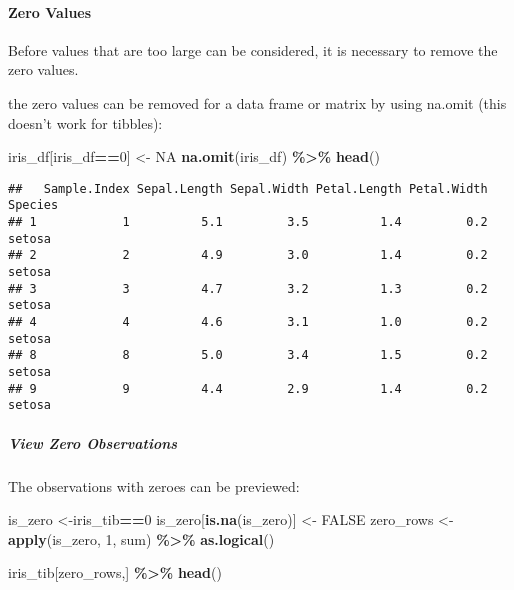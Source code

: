 \documentclass[
]{article}
\newenvironment{Shaded}{\begin{snugshade}}{\end{snugshade}}
\newcommand{\DecValTok}[1]{\textcolor[rgb]{0.00,0.00,0.81}{#1}}
\newcommand{\KeywordTok}[1]{\textcolor[rgb]{0.13,0.29,0.53}{\textbf{#1}}}
\newcommand{\NormalTok}[1]{#1}
\newcommand{\OperatorTok}[1]{\textcolor[rgb]{0.81,0.36,0.00}{\textbf{#1}}}
\newcommand{\OtherTok}[1]{\textcolor[rgb]{0.56,0.35,0.01}{#1}}
\newcommand{\StringTok}[1]{\textcolor[rgb]{0.31,0.60,0.02}{#1}}
\begin{document}
\hypertarget{zero-values}{%
\paragraph{Zero Values}\label{zero-values}}

Before values that are too large can be considered, it is necessary to
remove the zero values.

the zero values can be removed for a data frame or matrix by using
na.omit (this doesn't work for tibbles):

\begin{Shaded}
\begin{Highlighting}[]
\NormalTok{iris\_df[iris\_df}\OperatorTok{==}\DecValTok{0}\NormalTok{] <{-}}\StringTok{ }\OtherTok{NA}
\KeywordTok{na.omit}\NormalTok{(iris\_df) }\OperatorTok{\%>\%}\StringTok{ }\KeywordTok{head}\NormalTok{()}
\end{Highlighting}
\end{Shaded}

\begin{verbatim}
##   Sample.Index Sepal.Length Sepal.Width Petal.Length Petal.Width Species
## 1            1          5.1         3.5          1.4         0.2  setosa
## 2            2          4.9         3.0          1.4         0.2  setosa
## 3            3          4.7         3.2          1.3         0.2  setosa
## 4            4          4.6         3.1          1.0         0.2  setosa
## 8            8          5.0         3.4          1.5         0.2  setosa
## 9            9          4.4         2.9          1.4         0.2  setosa
\end{verbatim}

\hypertarget{view-zero-observations}{%
\subparagraph{View Zero Observations}\label{view-zero-observations}}

The observations with zeroes can be previewed:

\begin{Shaded}
\begin{Highlighting}[]
\NormalTok{is\_zero <{-}iris\_tib}\OperatorTok{==}\DecValTok{0}
\NormalTok{is\_zero[}\KeywordTok{is.na}\NormalTok{(is\_zero)] <{-}}\StringTok{ }\OtherTok{FALSE}
\NormalTok{zero\_rows <{-}}\StringTok{ }\KeywordTok{apply}\NormalTok{(is\_zero, }\DecValTok{1}\NormalTok{, sum) }\OperatorTok{\%>\%}\StringTok{ }\KeywordTok{as.logical}\NormalTok{()}

\NormalTok{iris\_tib[zero\_rows,] }\OperatorTok{\%>\%}\StringTok{ }\KeywordTok{head}\NormalTok{()}
\end{Highlighting}
\end{Shaded}
\end{document}
